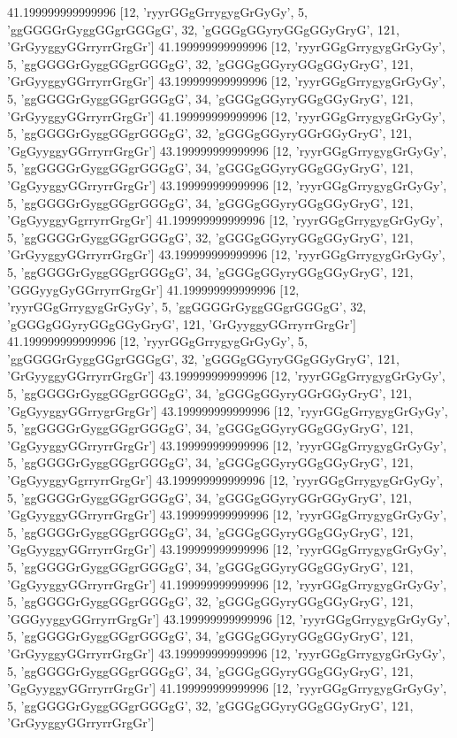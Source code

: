 41.199999999999996 [12, 'ryyrGGgGrrygygGrGyGy', 5, 'ggGGGGrGyggGGgrGGGgG', 32, 'gGGGgGGyryGGgGGyGryG', 121, 'GrGyyggyGGrryrrGrgGr']
41.199999999999996 [12, 'ryyrGGgGrrygygGrGyGy', 5, 'ggGGGGrGyggGGgrGGGgG', 32, 'gGGGgGGyryGGgGGyGryG', 121, 'GrGyyggyGGrryrrGrgGr']
43.199999999999996 [12, 'ryyrGGgGrrygygGrGyGy', 5, 'ggGGGGrGyggGGgrGGGgG', 34, 'gGGGgGGyryGGgGGyGryG', 121, 'GrGyyggyGGrryrrGrgGr']
41.199999999999996 [12, 'ryyrGGgGrrygygGrGyGy', 5, 'ggGGGGrGyggGGgrGGGgG', 32, 'gGGGgGGyryGGrGGyGryG', 121, 'GgGyyggyGGrryrrGrgGr']
43.199999999999996 [12, 'ryyrGGgGrrygygGrGyGy', 5, 'ggGGGGrGyggGGgrGGGgG', 34, 'gGGGgGGyryGGgGGyGryG', 121, 'GgGyyggyGGrryrrGrgGr']
43.199999999999996 [12, 'ryyrGGgGrrygygGrGyGy', 5, 'ggGGGGrGyggGGgrGGGgG', 34, 'gGGGgGGyryGGgGGyGryG', 121, 'GgGyyggyGgrryrrGrgGr']
41.199999999999996 [12, 'ryyrGGgGrrygygGrGyGy', 5, 'ggGGGGrGyggGGgrGGGgG', 32, 'gGGGgGGyryGGgGGyGryG', 121, 'GrGyyggyGGrryrrGrgGr']
43.199999999999996 [12, 'ryyrGGgGrrygygGrGyGy', 5, 'ggGGGGrGyggGGgrGGGgG', 34, 'gGGGgGGyryGGgGGyGryG', 121, 'GGGyygGyGGrryrrGrgGr']
41.199999999999996 [12, 'ryyrGGgGrrygygGrGyGy', 5, 'ggGGGGrGyggGGgrGGGgG', 32, 'gGGGgGGyryGGgGGyGryG', 121, 'GrGyyggyGGrryrrGrgGr']
41.199999999999996 [12, 'ryyrGGgGrrygygGrGyGy', 5, 'ggGGGGrGyggGGgrGGGgG', 32, 'gGGGgGGyryGGgGGyGryG', 121, 'GrGyyggyGGrryrrGrgGr']
43.199999999999996 [12, 'ryyrGGgGrrygygGrGyGy', 5, 'ggGGGGrGyggGGgrGGGgG', 34, 'gGGGgGGyryGGrGGyGryG', 121, 'GgGyyggyGGrrygrGrgGr']
43.199999999999996 [12, 'ryyrGGgGrrygygGrGyGy', 5, 'ggGGGGrGyggGGgrGGGgG', 34, 'gGGGgGGyryGGgGGyGryG', 121, 'GgGyyggyGGrryrrGrgGr']
43.199999999999996 [12, 'ryyrGGgGrrygygGrGyGy', 5, 'ggGGGGrGyggGGgrGGGgG', 34, 'gGGGgGGyryGGgGGyGryG', 121, 'GgGyyggyGgrryrrGrgGr']
43.199999999999996 [12, 'ryyrGGgGrrygygGrGyGy', 5, 'ggGGGGrGyggGGgrGGGgG', 34, 'gGGGgGGyryGGrGGyGryG', 121, 'GgGyyggyGGrryrrGrgGr']
43.199999999999996 [12, 'ryyrGGgGrrygygGrGyGy', 5, 'ggGGGGrGyggGGgrGGGgG', 34, 'gGGGgGGyryGGgGGyGryG', 121, 'GgGyyggyGGrryrrGrgGr']
43.199999999999996 [12, 'ryyrGGgGrrygygGrGyGy', 5, 'ggGGGGrGyggGGgrGGGgG', 34, 'gGGGgGGyryGGgGGyGryG', 121, 'GgGyyggyGGrryrrGrgGr']
41.199999999999996 [12, 'ryyrGGgGrrygygGrGyGy', 5, 'ggGGGGrGyggGGgrGGGgG', 32, 'gGGGgGGyryGGgGGyGryG', 121, 'GGGyyggyGGrryrrGrgGr']
43.199999999999996 [12, 'ryyrGGgGrrygygGrGyGy', 5, 'ggGGGGrGyggGGgrGGGgG', 34, 'gGGGgGGyryGGgGGyGryG', 121, 'GrGyyggyGGrryrrGrgGr']
43.199999999999996 [12, 'ryyrGGgGrrygygGrGyGy', 5, 'ggGGGGrGyggGGgrGGGgG', 34, 'gGGGgGGyryGGgGGyGryG', 121, 'GgGyyggyGGrryrrGrgGr']
41.199999999999996 [12, 'ryyrGGgGrrygygGrGyGy', 5, 'ggGGGGrGyggGGgrGGGgG', 32, 'gGGGgGGyryGGgGGyGryG', 121, 'GrGyyggyGGrryrrGrgGr']
